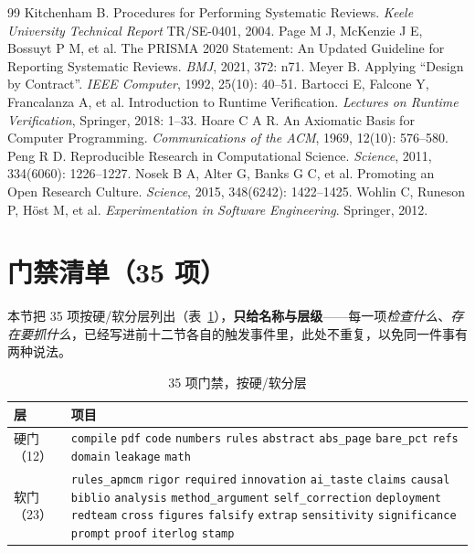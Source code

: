 \documentclass[11pt,a4paper]{article}
\newcommand{\code}[1]{\texttt{#1}}
\begin{document}
\begin{thebibliography}{99}
 Kitchenham B. Procedures for Performing Systematic Reviews. \emph{Keele University Technical Report} TR/SE-0401, 2004.
 Page M J, McKenzie J E, Bossuyt P M, et al. The PRISMA 2020 Statement: An Updated Guideline for Reporting Systematic Reviews. \emph{BMJ}, 2021, 372: n71.
 Meyer B. Applying ``Design by Contract''. \emph{IEEE Computer}, 1992, 25(10): 40--51.
 Bartocci E, Falcone Y, Francalanza A, et al. Introduction to Runtime Verification. \emph{Lectures on Runtime Verification}, Springer, 2018: 1--33.
 Hoare C A R. An Axiomatic Basis for Computer Programming. \emph{Communications of the ACM}, 1969, 12(10): 576--580.
 Peng R D. Reproducible Research in Computational Science. \emph{Science}, 2011, 334(6060): 1226--1227.
 Nosek B A, Alter G, Banks G C, et al. Promoting an Open Research Culture. \emph{Science}, 2015, 348(6242): 1422--1425.
 Wohlin C, Runeson P, H{\"o}st M, et al. \emph{Experimentation in Software Engineering}. Springer, 2012.
\end{thebibliography}

\newpage
\appendix
\section{门禁清单（35 项）}
本节把 35 项按硬/软分层列出（表~\ref{tab:gates}），\textbf{只给名称与层级}——每一项\emph{检查什么}、\emph{存在要抓什么}，已经写进前十二节各自的触发事件里，此处不重复，以免同一件事有两种说法。
\begin{table}[tbp]\centering\footnotesize
\caption{35 项门禁，按硬/软分层}\label{tab:gates}
\setlength{\tabcolsep}{3pt}
\begin{tabular}{p{1.5cm}p{12.2cm}}
\toprule
层 & 项目\\
\midrule
硬门（12） & \code{compile} \code{pdf} \code{code} \code{numbers} \code{rules}
\code{abstract} \code{abs\_page} \code{bare\_pct} \code{refs} \code{domain}
\code{leakage} \code{math}\\
软门（23） & \code{rules\_apmcm} \code{rigor} \code{required} \code{innovation}
\code{ai\_taste} \code{claims} \code{causal} \code{biblio} \code{analysis}
\code{method\_argument} \code{self\_correction} \code{deployment} \code{redteam}
\code{cross} \code{figures} \code{falsify} \code{extrap} \code{sensitivity}
\code{significance} \code{prompt} \code{proof} \code{iterlog} \code{stamp}\\
\bottomrule
\end{tabular}
\end{table}
\end{document}
